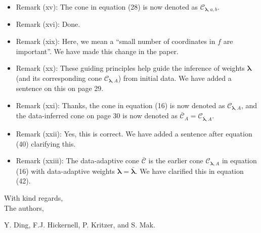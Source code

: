 \documentclass[11pt]{article}
\newcommand{\calC}{\mathcal{C}}
\begin{document}
\begin{itemize}
\item Remark (xv): The cone in equation (28) is now denoted as $\calC_{\boldsymbol{\lambda},a,b}$.
\item Remark (xvi): Done.
\item Remark (xix): Here, we mean a ``small number of coordinates in $f$ are important''. We have made this change in the paper.
\item Remark (xx): These guiding principles help guide the inference of weights $\boldsymbol{\lambda}$ (and its corresponding cone $\calC_{\boldsymbol{\lambda},A}$) from initial data. We have added a sentence on this on page 29. 
\item Remark (xxi): Thanks, the cone in equation (16) is now denoted as $\calC_{\boldsymbol{\lambda},A}$, and the data-inferred cone on page 30 is now denoted as $\bar{\calC}_A = \calC_{\bar{\boldsymbol{\lambda}},A}$.
\item Remark (xxii): Yes, this is correct. We have added a sentence after equation (40) clarifying this.
\item Remark (xxiii): The data-adaptive cone $\bar{\calC}$ is the earlier cone $\calC_{\boldsymbol{\lambda},A}$ in equation (16) with data-adaptive weights $\boldsymbol{\lambda} = \bar{\boldsymbol{\lambda}}$. We have clarified this in equation (42).

\end{itemize}

\bigskip 

\bigskip

\noindent With kind regards,\\[0.25cm]
The authors, 

\noindent Y. Ding, F.J. Hickernell, P. Kritzer, and S. Mak.
\end{document}
